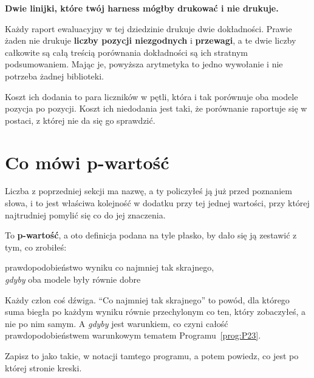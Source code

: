 \begin{fr}
\begin{aibox}
\textbf{Dwie linijki, które twój harness mógłby drukować i nie drukuje.}

Każdy raport ewaluacyjny w tej dziedzinie drukuje dwie dokładności. Prawie
żaden nie drukuje \textbf{liczby pozycji niezgodnych} i \textbf{przewagi}, a
te dwie liczby całkowite są całą treścią porównania \dash{} dokładności są ich
stratnym podsumowaniem. Mając je, powyższa arytmetyka to jedno wywołanie
 i nie potrzeba żadnej biblioteki.

Koszt ich dodania to para liczników w pętli, która i tak porównuje oba modele
pozycja po pozycji. Koszt ich niedodania jest taki, że porównanie raportuje
się w postaci, z której nie da się go sprawdzić.
\end{aibox}
\end{fr}

\section{Co mówi p-wartość}
\label{sec:P27-p-value}

\begin{fr}
Liczba z poprzedniej sekcji ma nazwę, a ty policzyłeś ją już przed poznaniem
słowa, i to jest właściwa kolejność \dash{} w dodatku przy tej jednej
wartości, przy której najtrudniej pomylić się co do jej znaczenia.

To \textbf{p-wartość}, a oto definicja podana na tyle płasko, by dało się ją
zestawić z tym, co zrobiłeś:

\begin{center}
prawdopodobieństwo wyniku co najmniej tak skrajnego,\\
\emph{gdyby} oba modele były równie dobre
\end{center}

Każdy człon coś dźwiga. \enquote{Co najmniej tak skrajnego} to powód, dla
którego suma biegła po każdym wyniku równie przechylonym co ten, który
zobaczyłeś, a nie po nim samym. A \emph{gdyby} jest warunkiem, co czyni
całość prawdopodobieństwem warunkowym \dash{} tematem
Programu~\ref{prog:P23}.

Zapisz to jako takie, w notacji tamtego programu, a potem powiedz, co jest po
której stronie kreski.
\dotline
\nextframe
\end{fr}

